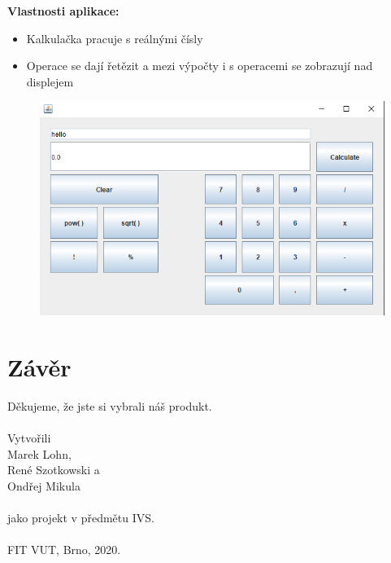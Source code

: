 \documentclass[a4paper, 11pt]{article}
\begin{document}
\noindent
\textbf{Vlastnosti aplikace:}

\begin{itemize}
    \item Kalkulačka pracuje s reálnými čísly
    \item Operace se dají řetězit a mezi výpočty i s operacemi se zobrazují nad displejem
\end{itemize}

\begin{figure}[ht]
	\centering
	\includegraphics[width=.7\textwidth]{../screenshot.png}
\end{figure}

\section{Závěr}

Děkujeme, že jste si vybrali náš produkt.\\
\\
\noindent
Vytvořili\\Marek Lohn,\\René Szotkowski a\\Ondřej Mikula\\\\jako projekt v předmětu IVS.\\\\
FIT VUT, Brno, 2020.
\end{document}
